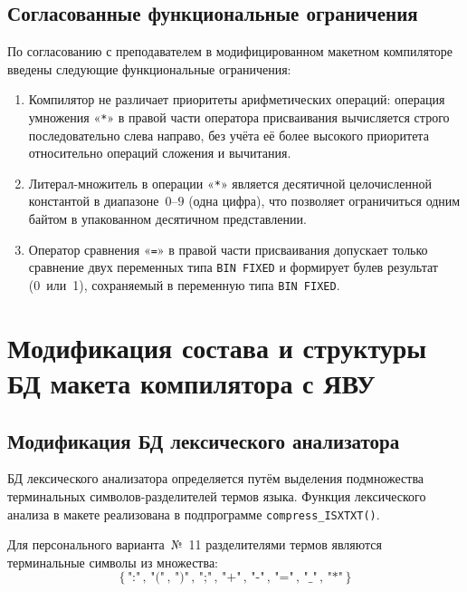 \documentclass[a4paper,14pt]{extarticle}
\begin{document}
\subsection*{Согласованные функциональные ограничения}

По согласованию с преподавателем в модифицированном макетном компиляторе введены
следующие функциональные ограничения:

\begin{enumerate}
  \item Компилятор не различает приоритеты арифметических операций: операция
        умножения «\texttt{*}» в правой части оператора присваивания
        вычисляется строго последовательно слева направо, без учёта её более
        высокого приоритета относительно операций сложения и вычитания.

  \item Литерал-множитель в операции «\texttt{*}» является десятичной целочисленной
        константой в диапазоне~$0$--$9$ (одна цифра), что позволяет ограничиться
        одним байтом в упакованном десятичном представлении.

  \item Оператор сравнения «\texttt{=}» в правой части присваивания допускает
        только сравнение двух переменных типа \texttt{BIN FIXED} и формирует
        булев результат (0~или~1), сохраняемый в переменную типа \texttt{BIN FIXED}.
\end{enumerate}

\section{Модификация состава и структуры БД макета компилятора с ЯВУ}

\subsection{Модификация БД лексического анализатора}

БД лексического анализатора определяется путём выделения подмножества терминальных
символов-разделителей термов языка. Функция лексического анализа в макете реализована
в подпрограмме \texttt{compress\_ISXTXT()}.

Для персонального варианта~№~11 разделителями термов являются терминальные символы
из множества:
\[
  \{\,\texttt{":"}\,,\, \texttt{"("}\,,\, \texttt{")"}\,,\, \texttt{";"}\,,\,
     \texttt{"+"}\,,\, \texttt{"-"}\,,\, \texttt{"="}\,,\, \texttt{"\_"}\,,\,
     \texttt{"*"}\,\}
\]
\end{document}
